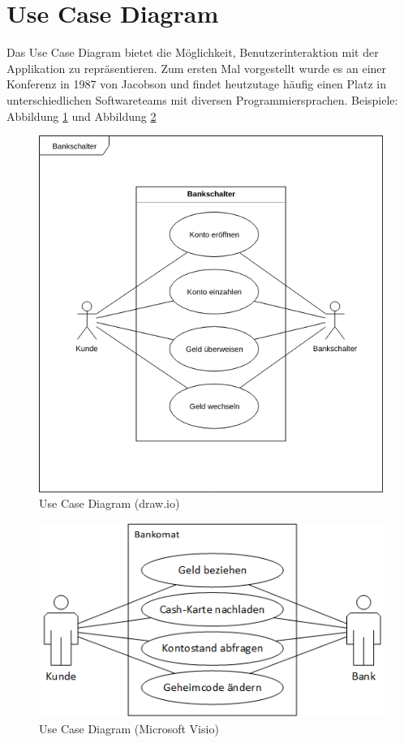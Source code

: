 \documentclass[a4paper, titlepage]{scrartcl}
\begin{document}
    \section{Use Case Diagram}
    Das Use Case Diagram bietet die Möglichkeit, Benutzerinteraktion mit
    der Applikation zu repräsentieren. Zum ersten Mal vorgestellt wurde
    es an einer Konferenz in 1987 von Jacobson und findet heutzutage häufig
    einen Platz in unterschiedlichen Softwareteams mit diversen Programmiersprachen.
    Beispiele: Abbildung \ref{UseCaseDrawIO} und Abbildung \ref{UseCaseVisio}
    \begin{figure}
        \includegraphics[width=\textwidth]{Anwendungsfalldiagramm1a.png}
        \caption{Use Case Diagram (draw.io)}
        \label{UseCaseDrawIO}
    \end{figure}
    \begin{figure}
        \includegraphics[width=\textwidth]{Anwendungsfalldiagramm1c.png}
        \caption{Use Case Diagram (Microsoft Visio)}
        \label{UseCaseVisio}
    \end{figure}
\end{document}
